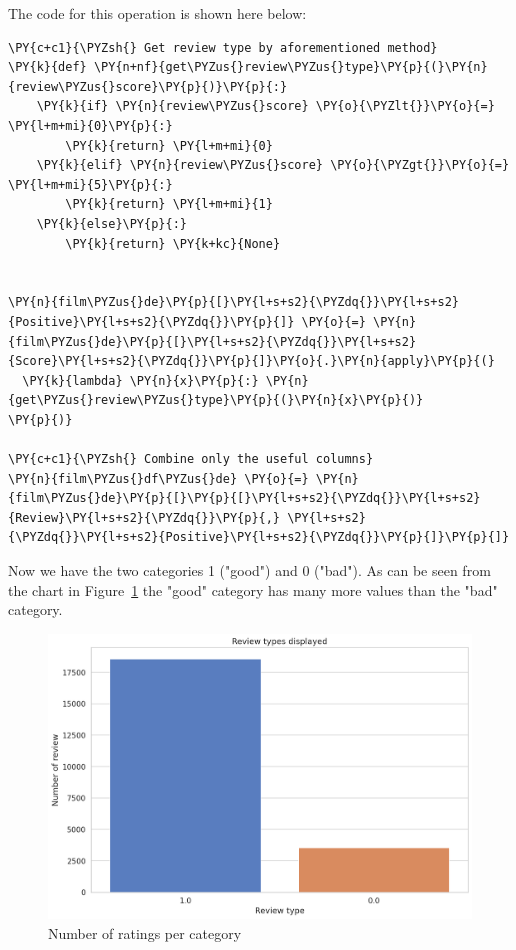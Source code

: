 The code for this operation is shown here below:

        \begin{tcolorbox}[breakable, size=fbox, boxrule=1pt, pad at break*=1mm,colback=cellbackground, colframe=cellborder]
\begin{Verbatim}[commandchars=\\\{\},fontsize=\footnotesize]
\PY{c+c1}{\PYZsh{} Get review type by aforementioned method}
\PY{k}{def} \PY{n+nf}{get\PYZus{}review\PYZus{}type}\PY{p}{(}\PY{n}{review\PYZus{}score}\PY{p}{)}\PY{p}{:}
    \PY{k}{if} \PY{n}{review\PYZus{}score} \PY{o}{\PYZlt{}}\PY{o}{=} \PY{l+m+mi}{0}\PY{p}{:}
        \PY{k}{return} \PY{l+m+mi}{0}
    \PY{k}{elif} \PY{n}{review\PYZus{}score} \PY{o}{\PYZgt{}}\PY{o}{=} \PY{l+m+mi}{5}\PY{p}{:}
        \PY{k}{return} \PY{l+m+mi}{1}
    \PY{k}{else}\PY{p}{:}
        \PY{k}{return} \PY{k+kc}{None}


\PY{n}{film\PYZus{}de}\PY{p}{[}\PY{l+s+s2}{\PYZdq{}}\PY{l+s+s2}{Positive}\PY{l+s+s2}{\PYZdq{}}\PY{p}{]} \PY{o}{=} \PY{n}{film\PYZus{}de}\PY{p}{[}\PY{l+s+s2}{\PYZdq{}}\PY{l+s+s2}{Score}\PY{l+s+s2}{\PYZdq{}}\PY{p}{]}\PY{o}{.}\PY{n}{apply}\PY{p}{(}
  \PY{k}{lambda} \PY{n}{x}\PY{p}{:} \PY{n}{get\PYZus{}review\PYZus{}type}\PY{p}{(}\PY{n}{x}\PY{p}{)}
\PY{p}{)}

\PY{c+c1}{\PYZsh{} Combine only the useful columns}
\PY{n}{film\PYZus{}df\PYZus{}de} \PY{o}{=} \PY{n}{film\PYZus{}de}\PY{p}{[}\PY{p}{[}\PY{l+s+s2}{\PYZdq{}}\PY{l+s+s2}{Review}\PY{l+s+s2}{\PYZdq{}}\PY{p}{,} \PY{l+s+s2}{\PYZdq{}}\PY{l+s+s2}{Positive}\PY{l+s+s2}{\PYZdq{}}\PY{p}{]}\PY{p}{]}
\end{Verbatim}
\end{tcolorbox}

Now we have the two categories 1 ("good") and 0 ("bad"). As can be seen from the chart in Figure~\ref{fig:fig_04}  the "good" category has many more values than the "bad" category.

\begin{figure}[H]
\centering
\includegraphics[width=1\textwidth]{images/output_43_1.png}
\caption{Number of ratings per category}
\label{fig:fig_04}
\end{figure}
\FloatBarrier
